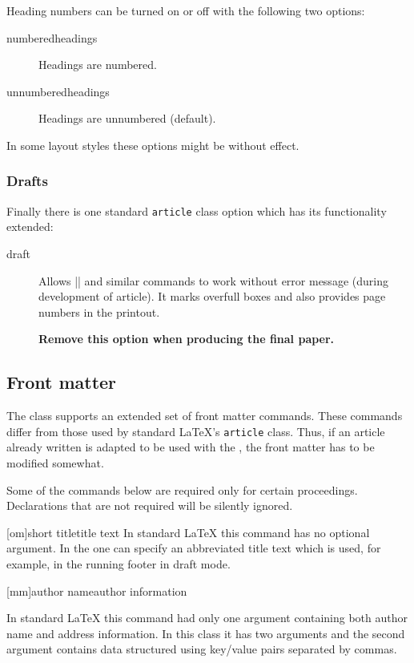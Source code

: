 Heading numbers can be turned on or off with the following two options:
\begin{description}
\item[numberedheadings] Headings are numbered.
\item[unnumberedheadings] Headings are unnumbered (default).
\end{description}
In some layout styles these options might be without effect.

\subsubsection{Drafts}

Finally there is one standard \texttt{article} class option which has
its functionality extended:
\begin{description}
\item[draft] Allows |\tableofcontents| and similar commands to work
  without error message (during development of article). It marks
  overfull boxes and
  also provides page numbers in the printout.


  \textbf{Remove this option when producing the final paper.}
\end{description}

\subsection{Front matter}

The class supports an extended set of front matter commands. These
commands differ from those used by standard \LaTeX's \texttt{article}
class. Thus, if an article already written is adapted to be used with
the \aipcls{}, the front matter has to be modified somewhat.

Some of the commands below
are required only for certain proceedings. Declarations that are not
required will be silently ignored.

[om]{short title}{title text}
In standard \LaTeX{} this command has no optional argument. In the
\aipcls{} one can specify an abbreviated title text which is used,
for example, in the running footer in draft mode.

[mm]{author name}{author information}

In standard \LaTeX{} this command had only one argument containing
both author name and address information. In this class it has two
arguments and the second argument contains data structured using
key/value pairs separated by commas.


